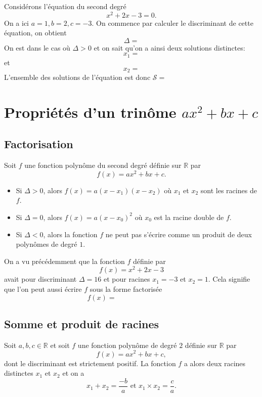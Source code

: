 \documentclass[11pt]{article}
\begin{document}
\begin{exemple}
  Considérons l'équation du second degré
  \[
    x^2+2x-3 = 0.
  \]
  On a ici $a=1, b=2, c=-3$. On commence par calculer le discriminant de cette
  équation, on obtient
  \[
    \Delta =
  \]
  On est dans le cas où $\Delta>0$ et on sait qu'on a ainsi deux solutions
  distinctes:
  \[
    x_1 =
  \]
  et
  \[
    x_2 =
  \]
 L'ensemble des solutions de l'équation est donc $\mathscr S =$
\end{exemple}

\section{Propriétés d'un trinôme $ax^2+bx+c$}
\subsection{Factorisation}

\begin{propadm}
  Soit $f$ une fonction polynôme du second degré définie sur $\mathbb{R}$ par
  \[
    f(x) = ax^2+bx+c.
  \]
  \begin{itemize}
    \item Si $\Delta>0$, alors $f(x)=a(x-x_1)(x-x_2)$ où $x_1$ et $x_2$ sont les
      racines de $f$.
    \item Si $\Delta=0$, alors $f(x)=a(x-x_0)^2$ où $x_0$ est la racine double de
      $f$.
    \item Si $\Delta<0$, alors la fonction $f$ ne peut pas s'écrire comme un
      produit de deux polynômes de degré $1$.
  \end{itemize}
\end{propadm}

\begin{exemple}
  On a vu précédemment que la fonction $f$ définie par
  \[
    f(x) = x^2+2x-3
  \]
  avait pour discriminant $\Delta=16$ et pour racines $x_1=-3$ et $x_2=1$. Cela
  signifie que l'on peut aussi écrire $f$ sous la forme factorisée
  \[
    f(x) =\phantom{(x+3)(x-1).}
  \]
\end{exemple}

\subsection{Somme et produit de racines}
\begin{propadm}
  Soit $a,b,c\in\mathbb{R}$ et soit $f$ une fonction polynôme de degré $2$
  définie sur $\mathbb{R}$ par
  \[
    f(x)=ax^2+bx+c,
  \]
  dont le discriminant est strictement positif. La fonction $f$ a alors deux
  racines distinctes $x_1$ et $x_2$ et on a
  \[
    x_1+x_2 = \frac{-b}{a}\text{ et }x_1\times x_2=\frac{c}{a}.
  \]
\end{propadm}
\end{document}
